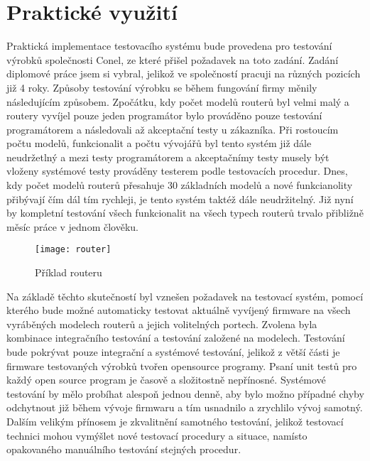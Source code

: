 \section{Praktické využití}
Praktická implementace testovacího systému bude provedena pro testování výrobků společnosti Conel, ze které přišel požadavek na toto zadání. Zadání diplomové práce jsem si vybral, jelikož ve společností pracuji na různých pozicích již 4 roky. Způsoby testování výrobku se během fungování firmy měnily následujícím způsobem. Zpočátku, kdy počet modelů routerů byl velmi malý a routery vyvíjel pouze jeden programátor bylo prováděno pouze testování programátorem a následovali až akceptační testy u zákazníka. Při rostoucím počtu modelů, funkcionalit a počtu vývojářů byl tento systém již dále neudržetlný a mezi testy programátorem a akceptačnímy testy musely být vloženy systémové testy prováděny testerem podle testovacích procedur. Dnes, kdy počet modelů routerů přesahuje 30 základních modelů a nové funkcianolity přibývají čím dál tím rychleji, je tento systém taktéž dále neudržitelný. Již nyní by kompletní testování všech funkcionalit na všech typech routerů trvalo přibližně měsíc práce v jednom člověku.

\begin{figure}[h]
	\centering
	\texttt{[image: router]}
	\caption{Příklad routeru}
	\label{fig:router}
\end{figure}

Na základě těchto skutečností byl vznešen požadavek na testovací systém, pomocí kterého bude možné automaticky testovat aktuálně vyvíjený firmware na všech vyráběných modelech routerů a jejich volitelných portech. Zvolena byla kombinace integračního testování a testování založené na modelech. Testování bude pokrývat pouze integrační a systémové testování, jelikož z větší části je firmware testovaných výrobků tvořen opensource programy. Psaní unit testů pro každý open source program je časově a složitostně nepřínosné. Systémové testování by mělo probíhat alespoň jednou denně, aby bylo možno případné chyby odchytnout již během vývoje firmwaru a tím usnadnilo a zrychlilo vývoj samotný. Dalším velikým přínosem je zkvalitnění samotného testování, jelikož testovací technici mohou vymýšlet nové testovací procedury a situace, namísto opakovaného manuálního testování stejných procedur.

